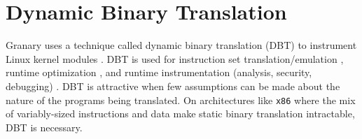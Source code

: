 \documentclass{sigplanconf}
\newcommand{\comment}[1]{}
\begin{document}
%	

\section{Dynamic Binary Translation}\label{sec:dbt}


Granary uses a technique called dynamic binary translation (DBT) to instrument Linux kernel modules \cite{DynamoRIO}. DBT is used for instruction set translation/emulation \cite{QEMU}, runtime optimization \cite{DynamoRIOOptimisation}, and runtime instrumentation (analysis, security, debugging) \cite{Vx32,NaCl,Valgrind}. DBT is attractive when few assumptions can be made about the nature of the programs being translated. On architectures like \texttt{x86} where the mix of variably-sized instructions and data make static binary translation intractable, DBT is necessary.
\end{document}

